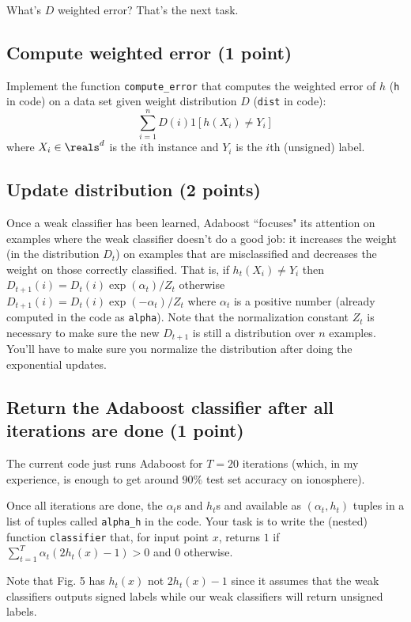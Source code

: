 \documentclass{article}
\begin{document}
What's $D$ weighted error? That's the next task.

\subsection{Compute weighted error (1 point)}

Implement the function {\tt compute\_error} that computes the weighted error of $h$ ({\tt h} in code) on a data set given weight
distribution $D$ ({\tt dist} in code):
$$
\sum_{i=1}^n D(i) 1[h(X_i) \neq Y_i]
$$
where $X_i \in \reals^d$ is the $i$th instance and $Y_i$ is the $i$th (unsigned) label.

\subsection{Update distribution (2 points)}

Once a weak classifier has been learned, Adaboost ``focuses" its attention on examples where the weak classifier doesn't do a good job:
it increases the weight (in the distribution $D_t$) on examples that are misclassified and decreases the weight on those correctly classified.
That is, if $h_t(X_i) \neq Y_i$ then $D_{t+1}(i) = D_t(i)\exp(\alpha_t)/Z_t$ otherwise $D_{t+1}(i) = D_t(i)\exp(-\alpha_t)/Z_t$ where
$\alpha_t$ is a positive number (already computed in the code as {\tt alpha}). Note that the normalization constant $Z_t$ is necessary
to make sure the new $D_{t+1}$ is still a distribution over $n$ examples. You'll have to make sure you normalize the distribution after
doing the exponential updates.

\subsection{Return the Adaboost classifier after all iterations are done (1 point)}

The current code just runs Adaboost for $T=20$ iterations (which, in my experience, is enough to get around $90\%$ test set accuracy
on ionosphere).

Once all iterations are done, the $\alpha_t$s and $h_t$s and available as $(\alpha_t, h_t)$ tuples in a list of tuples called
{\tt alpha\_h} in the code. Your task is to write the (nested) function {\tt classifier}
that, for input point $x$, returns $1$ if $\sum_{t=1}^T \alpha_t (2h_t(x)-1) > 0$ and $0$ otherwise.

Note that Fig. 5 has $h_t(x)$ not $2h_t(x)-1$ since it assumes that the weak classifiers outputs signed labels
while our weak classifiers will return unsigned labels.
\end{document}
